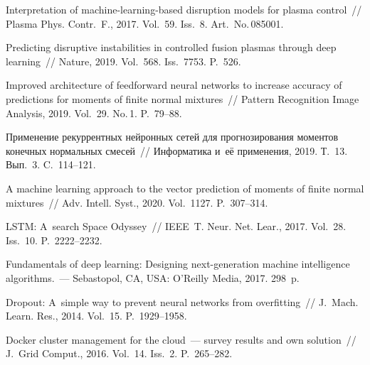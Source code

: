 \begin{multicols}{2}
{{\begin{thebibliography}{99}
 Interpretation of machine-learning-based 
disruption models for plasma control~// Plasma Phys. Contr.~F., 
2017. Vol.~59. Iss.~8. Art.~No.\,085001. %

Predicting disruptive instabilities in controlled fusion 
plasmas through deep learning~// Nature, 2019. Vol.~568. Iss.~7753. P.~526. 

Improved architecture of feedforward neural networks to increase accuracy 
of  predictions for moments of finite normal mixtures~// 
Pattern Recognition Image Analysis, 2019. Vol.~29. No.\,1. P.~79--88.

Применение рекуррентных нейронных сетей для прогнозирования моментов 
конечных нормальных смесей~// Информатика и~её применения, 2019. Т.~13. Вып.~3. C.~114--121.

 A machine learning approach to the 
vector prediction of moments of finite normal mixtures~// 
Adv. Intell. Syst., 2020. Vol.~1127. P.~307--314. %


 LSTM: A~search Space Odyssey~// IEEE~T.
 Neur. Net. Lear., 2017. Vol.~28. Iss.~10. P.~2222--2232.


 Fundamentals of deep learning: Designing 
next-generation machine intelligence algorithms.~--- 
Sebastopol, CA, USA: O'Reilly Media, 2017. 298~p.

Dropout: A~simple way to prevent neural networks from overfitting~// 
J.~Mach. Learn. Res., 2014. Vol.~15. P.~1929--1958.

 Docker 
cluster management for the cloud~--- survey results and own solution~// 
J.~Grid Comput., 2016. Vol.~14. Iss.~2. P.~265--282. %
 \end{thebibliography}

 }
 }

\end{multicols}

\vspace*{-9pt}

